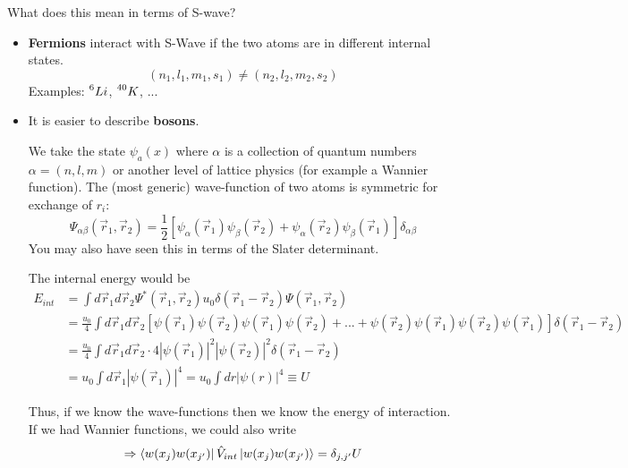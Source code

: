 \noindent What does this mean in terms of S-wave?
\begin{itemize}
    \item \textbf{Fermions} interact with S-Wave if the two atoms are in different internal states.
    \begin{equation*}
        (n_1, l_1, m_1, s_1)
        \neq (n_2, l_2, m_2, s_2)
    \end{equation*}
    Examples: $\prescript{6}{}{Li}$, $\prescript{40}{}{K}$, ...
    \item It is easier to describe \textbf{bosons}.

    We take the state $\psi_a(x)$ where $\alpha$ is a collection of quantum numbers $\alpha = (n, l, m)$ or another level of lattice physics (for example a Wannier function). The (most generic) wave-function of two atoms is symmetric for exchange of $r_i$:
    \begin{equation*}
        \Psi_{\alpha\beta}(\vec{r}_1,\vec{r}_2) = \frac{1}{2}
        \left[
            \psi_\alpha(\vec{r}_1)\psi_\beta(\vec{r}_2) +
            \psi_\alpha(\vec{r}_2)\psi_\beta(\vec{r}_1)
        \right]\delta_{\alpha\beta}
    \end{equation*}
    You may also have seen this in terms of the Slater determinant.
    
    The internal energy would be
    \begin{align*}
        E_{int} &= \int d\vec{r}_1 d\vec{r}_2
        \Psi^*(\vec{r}_1,\vec{r}_2) u_0 \delta(\vec{r}_1-\vec{r}_2) \Psi(\vec{r}_1,\vec{r}_2)\\
        &= \frac{u_0}{4} \int d\vec{r}_1 d\vec{r}_2
        \left[
            \psi(\vec{r}_1)\psi(\vec{r}_2)\psi(\vec{r}_1)\psi(\vec{r}_2) + ... + \psi(\vec{r}_2)\psi(\vec{r}_1)\psi(\vec{r}_2)\psi(\vec{r}_1)
        \right] \delta(\vec{r}_1 - \vec{r}_2)\\
        &= \frac{u_0}{4} \int d\vec{r}_1 d\vec{r}_2 \cdot
            4 |\psi(\vec{r}_1)|^2|\psi(\vec{r}_2)|^2
            \delta(\vec{r}_1 - \vec{r}_2)\\
        &= u_0 \int d\vec{r}_1 |\psi(\vec{r}_1)|^4 =
            u_0 \int dr |\psi(r)|^4 \equiv U
    \end{align*}
    
    Thus, if we know the wave-functions then we know the energy of interaction. If we had Wannier functions, we could also write
    \begin{equation*}
    \Rightarrow \bra{w(x_j)w(x_{j'})} \hat{V}_{int} \ket{w(x_j)w(x_{j'})} = \delta_{j,j'}U
    \end{equation*}


\end{itemize}







